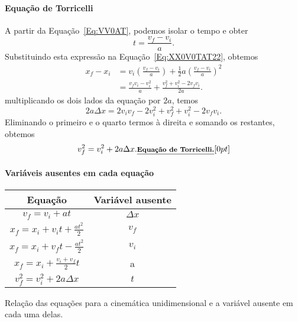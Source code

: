 \paragraph{Equação de Torricelli}

A partir da Equação~\ref{Eq:VV0AT}, podemos isolar o tempo e obter
\begin{equation}
  t = \frac{v_f-v_i}{a}.
\end{equation}
%
Substituindo esta expressão na Equação~\ref{Eq:XX0V0TAT22}, obtemos
\begin{align}
  x_f - x_i &= v_i \left(\frac{v_f-v_i}{a}\right) + \frac{1}{2} a \left(\frac{v_f-v_i}{a}\right)^2 \\
  &= \frac{v_f v_i - v_i^2}{a} + \frac{v_f^2 + v_i^2-2v_fv_i}{2a}.
\end{align}
%
multiplicando os dois lados da equação por $2a$, temos
\begin{equation}
  2a\Delta x = 2v_i v_f - 2v_i^2 + v_f^2 +v_i^2 - 2v_f v_i.
\end{equation}
%
Eliminando o primeiro e o quarto termos à direita e somando os restantes, obtemos
\begin{equation}
  v_f^2 = v_i^2 + 2 a \Delta x. \relax{\footnotesize\emph{\textbf{Equação de Torricelli.}}}[0pt]
\end{equation}

\paragraph{Variáveis ausentes em cada equação}

\begin{margintable}[2cm]
\centering
\begin{tabular}{cc}
\toprule
Equação & Variável ausente\\
\midrule
$v_f = v_i + at$ & $\Delta x$ \\
$x_f = x_i + v_i t +\frac{at^2}{2}$ & $v_f$ \\
$x_f = x_i + v_f t - \frac{at^2}{2}$ & $v_i$ \\
$x_f = x_i + \frac{v_i + v_f}{2} t$ & a \\
$v_f^2 = v_i^2 + 2 a \Delta x$ & $t$ \\
\bottomrule
\end{tabular}
\caption{Relação das equações para a cinemática unidimensional e a variável ausente em cada uma delas. \label{Tab:EqsCinematicasVarAusentes}}
\end{margintable}

